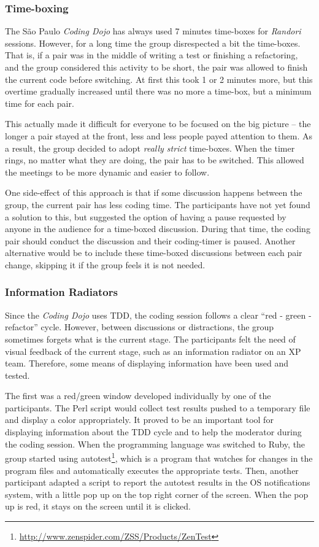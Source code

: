 \subsubsection{Time-boxing}

The São Paulo \emph{Coding Dojo} has always used 7 minutes time-boxes
for \emph{Randori} sessions. However, for a long time the group
disrespected a bit the time-boxes. That is, if a pair was in the
middle of writing a test or finishing a refactoring, and the group
considered this activity to be short, the pair was allowed to finish
the current code before switching. At first this took 1 or 2 minutes
more, but this overtime gradually increased until there was no more a
time-box, but a minimum time for each pair.

This actually made it difficult for everyone to be focused on the big
picture -- the longer a pair stayed at the front, less and less people
payed attention to them. As a result, the group decided to adopt
\emph{really strict} time-boxes. When the timer rings, no matter
what they are doing, the pair has to be switched. This allowed the
meetings to be more dynamic and easier to follow.

One side-effect of this approach is that if some discussion happens
between the group, the current pair has less coding time. The
participants have not yet found a solution to this, but suggested the
option of having a pause requested by anyone in the audience for a
time-boxed discussion. During that time, the coding pair should
conduct the discussion and their coding-timer is paused. Another
alternative would be to include these time-boxed discussions between
each pair change, skipping it if the group feels it is not needed.

\subsubsection{Information Radiators}

Since the \emph{Coding Dojo} uses TDD, the coding session follows a
clear ``red - green - refactor'' cycle. However, between discussions or
distractions, the group sometimes forgets what is the current
stage. The participants felt the need of visual feedback of the
current stage, such as an information radiator on an XP team. Therefore,
some means of displaying information have been used and tested.

The first was a red/green window developed individually by one of the
participants. The Perl script would collect test results pushed to a
temporary file and display a color appropriately. It proved to be an
important tool for displaying information about the TDD cycle and to
help the moderator during the coding session. When the programming
language was switched to Ruby, the group started using
autotest\footnote{\url{http://www.zenspider.com/ZSS/Products/ZenTest}},
which is a program that watches for changes in the program files and
automatically executes the appropriate tests. Then, another
participant adapted a script to report the autotest results in the OS
notifications system, with a little pop up on the top right corner of
the screen. When the pop up is red, it stays on the screen until it is
clicked.


